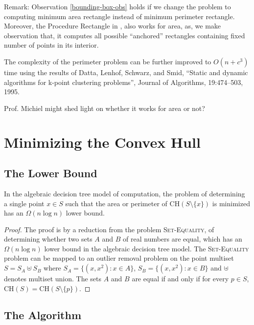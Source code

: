 \documentclass[lotsofwhite]{patmorin}
\newcommand{\ch}{\mathrm{CH}}
\begin{document}
\noindent Remark: 
Observation \ref{bounding-box-obs} holds if we change the problem to
computing minimum area rectangle instead of minimum perimeter
rectangle.  Moreover, the {\sf Procedure Rectangle} in \cite{aiks89},
also works for area, as, we make observation that, it computes all possible
``anchored'' rectangles containing fixed number of points in its
interior.

The complexity of the perimeter problem can be further improved to
$O(n+c^3)$ time using the results of Datta, Lenhof, Schwarz, and Smid,
``Static and dynamic algorithms for k-point clustering problems'',
Journal of Algorithms, 19:474--503, 1995.

Prof. Michiel  might shed light on whether it works for area or not? 

 


\section{Minimizing the Convex Hull}


\subsection{The Lower Bound}


\begin{thm}
In the algebraic decision tree model of computation, the problem of
determining a single point $x\in S$ such that the area or perimeter of
$\ch(S\setminus\{x\})$ is minimized has an $\Omega(n\log n)$ lower
bound.
\end{thm}

\begin{proof}
The proof is by a reduction from the problem \textsc{Set-Equality}, of
determining whether two sets $A$ and $B$ of real numbers are equal,
which has an $\Omega(n\log n)$ lower bound in the algebraic decision
tree model.
The \textsc{Set-Equality} problem can be mapped to an outlier removal
problem on the point multiset $S=S_A \uplus S_B$ where $S_A=\{(x,x^2):
x\in A\}$, $S_B=\{(x,x^2):x\in B\}$ and $\uplus$ denotes multiset
union. The sets $A$ and $B$ are equal if and only if for every $p\in
S$, $\ch(S)=\ch(S\setminus\{p\})$.
\end{proof}

\subsection{The Algorithm}
\end{document}

